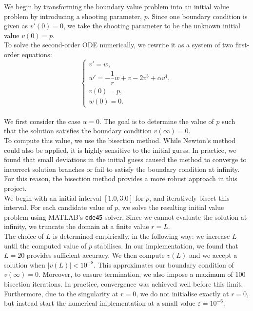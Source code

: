 \documentclass[12pt]{article}
\begin{document}
We begin by transforming the boundary value problem into an initial value problem by introducing a shooting parameter, $p$. Since one boundary condition is given as $v'(0) = 0$, we take the shooting parameter to be the unknown initial value $v(0) = p$.\\

To solve the second-order ODE numerically, we rewrite it as a system of two first-order equations:\\
\[
\begin{cases}
v' = w, \\
w' = -\dfrac{1}{r}w + v - 2v^3 + \alpha v^4, \\
v(0) = p, \\
w(0) = 0.
\end{cases}
\]\\

We first consider the case $\alpha = 0$. The goal is to determine the value of $p$ such that the solution satisfies the boundary condition $v(\infty) = 0$.\\

To compute this value, we use the bisection method. While Newton's method could also be applied, it is highly sensitive to the initial guess. In practice, we found that small deviations in the initial guess caused the method to converge to incorrect solution branches or fail to satisfy the boundary condition at infinity. For this reason, the bisection method provides a more robust approach in this project.\\

We begin with an initial interval $[1.0, 3.0]$ for $p$, and iteratively bisect this interval. For each candidate value of $p$, we solve the resulting initial value problem using MATLAB's \texttt{ode45} solver. Since we cannot evaluate the solution at infinity, we truncate the domain at a finite value $r = L$. \\

The choice of $L$ is determined empirically, in the following way: we increase $L$ until the computed value of $p$ stabilises. In our implementation, we found that $L = 20$ provides sufficient accuracy. We then compute $v(L)$ and we accept a solution when $|v(L)| < 10^{-8}$. This approximates our boundary condition of $v(\infty) = 0$. Moreover, to ensure termination, we also impose a maximum of 100 bisection iterations. In practice, convergence was achieved well before this limit.\\

Furthermore, due to the singularity at $r = 0$, we do not initialise exactly at $r = 0$, but instead start the numerical implementation at a small value $\varepsilon = 10^{-6}$.\\
\end{document}
